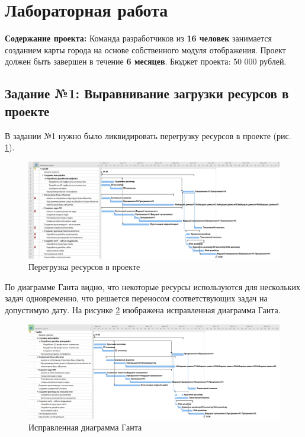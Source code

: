 \section*{Лабораторная работа}
\textbf{Содержание проекта:} Команда разработчиков из \textbf{16 человек} занимается созданием карты города на основе собственного модуля отображения. Проект должен быть завершен в течение \textbf{6 месяцев}. Бюджет проекта: 50 000 рублей.

\subsection*{Задание №1: Выравнивание загрузки ресурсов в проекте}

В задании №1 нужно было ликвидировать перегрузку ресурсов в проекте (рис. \ref{p1}).
\begin{figure}[!h]
	\centering
	\includegraphics[width=1\linewidth]{inc/img/1.png}
	\caption{Перегрузка ресурсов в проекте}
	\label{p1}
\end{figure}

По диаграмме Ганта видно, что некоторые ресурсы используются для нескольких задач одновременно, что решается переносом соответствующих задач на допустимую дату. На рисунке \ref{p2} изображена исправленная диаграмма Ганта.

\begin{figure}[!h]
	\centering
	\includegraphics[width=1\linewidth]{inc/img/2.png}
	\caption{Исправленная диаграмма Ганта}
	\label{p2}
\end{figure}

